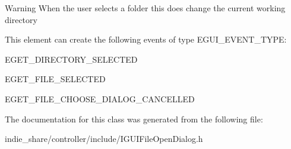 \begin{DoxyWarning}{Warning}
When the user selects a folder this does change the current working directory
\end{DoxyWarning}
\begin{DoxyParagraph}{This element can create the following events of type E\+G\+U\+I\+\_\+\+E\+V\+E\+N\+T\+\_\+\+T\+Y\+PE\+:}
\begin{DoxyItemize}
\item E\+G\+E\+T\+\_\+\+D\+I\+R\+E\+C\+T\+O\+R\+Y\+\_\+\+S\+E\+L\+E\+C\+T\+ED \item E\+G\+E\+T\+\_\+\+F\+I\+L\+E\+\_\+\+S\+E\+L\+E\+C\+T\+ED \item E\+G\+E\+T\+\_\+\+F\+I\+L\+E\+\_\+\+C\+H\+O\+O\+S\+E\+\_\+\+D\+I\+A\+L\+O\+G\+\_\+\+C\+A\+N\+C\+E\+L\+L\+ED \end{DoxyItemize}

\end{DoxyParagraph}


The documentation for this class was generated from the following file\+:\begin{DoxyCompactItemize}
\item 
indie\+\_\+share/controller/include/I\+G\+U\+I\+File\+Open\+Dialog.\+h\end{DoxyCompactItemize}
